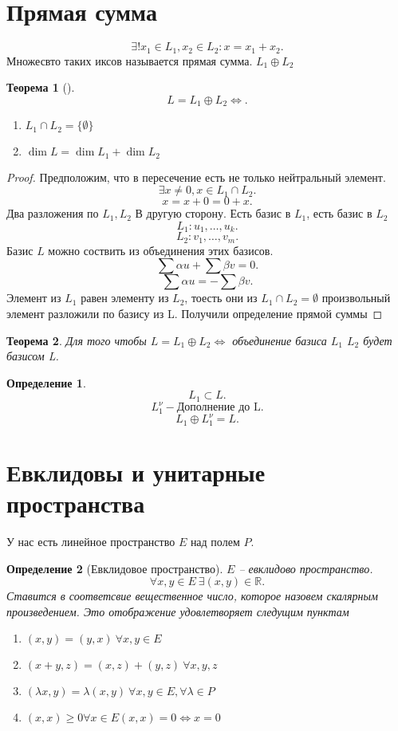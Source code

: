 \documentclass{scrartcl}
\newtheorem{theorem}{Теорема}
\newtheorem{definition}{Определение}
\begin{document}
\section{Прямая сумма}
\[
	\exists  ! x_1 \in L_1 , x_2 \in L_2 : x = x_1 + x_2
	.\]
Множесвто таких иксов называется прямая сумма. $L_1 \oplus L_2$
\begin{theorem}[]
	\[
		L = L_1 \oplus L_2 \iff
		.\]
	\begin{enumerate}
		\item $L_1 \cap L_2 = \{ \emptyset \}$
		\item $\dim{L} = \dim{L_1} + \dim{L_2}$
	\end{enumerate}
\end{theorem}
\begin{proof}
	Предположим, что в пересечение есть не только нейтральный элемент.
	\[
		\exists x \neq 0 , x \in L_1 \cap L_2
		.\]
	\[
		x = x + 0 = 0 + x
		.\]
	Два разложения по $L_1,L_2$
	В другую сторону. Есть базис в $L_1$, есть базис в  $L_2$
	\[
		L_1 : u_1,\dots,u_{k}
		.\]
	\[
		L_2 : v_1,\dots,v_{m}
		.\]
	Базис $L$ можно соствить из объединения этих базисов.
	\[
		\sum \alpha u + \sum \beta v = 0
		.\]
	\[
		\sum \alpha u = - \sum \beta v
		.\]
	Элемент из $L_1$ равен элементу из $L_2$, тоесть они из $L_1 \cap L_2 = \emptyset$
	произвольный элемент разложили по базису из L. Получили определение прямой суммы
\end{proof}
\begin{theorem}
	Для того чтобы $L = L_1 \oplus L_2 \iff $ объединение базиса $L_1$ $L_2$ будет базисом L.
\end{theorem}
\begin{definition}
	\[
		L_1 \subset L
		.\]
	\[
		L^{\nu}_{1} - \text{Дополнение до L}
		.\]
	\[
		L_1 \oplus L_1^{\nu} = L
		.\]
\end{definition}
\section{Евклидовы и унитарные пространства}
У нас есть линейное пространство $E$ над полем $P$.
\begin{definition}[Евклидовое пространство]
	$E$ -- евклидово пространство.
	\[
		\forall  x,y \in E ~ \exists  (x,y) \in \mathbb{R}
		.\]
	Ставится в соответсвие вещественное число, которое назовем скалярным произведением. Это отображение удовлетворяет следущим пунктам
	\begin{enumerate}
		\item $(x,y) = (y,x) ~ \forall  x, y \in E$
		\item $(x + y,z) = (x,z) + (y,z) ~\forall  x,y,z$
		\item $(\lambda x,y) = \lambda(x,y) ~ \forall  x,y \in E, \forall  \lambda \in P$
		\item $(x,x) \ge 0 \forall  x \in E (x,x) = 0 \iff x = 0$
	\end{enumerate}
\end{definition}
\end{document}
